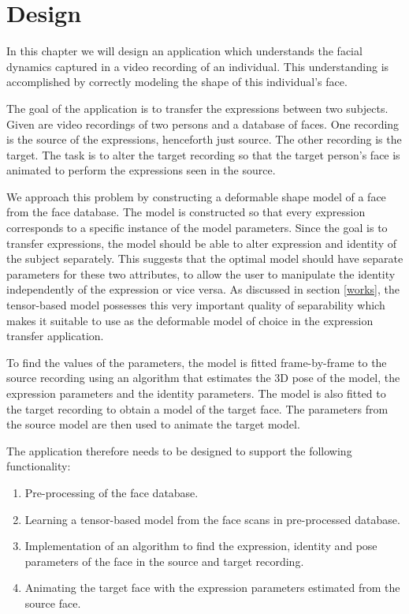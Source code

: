 \documentclass[11pt,a4paper]{report}
\begin{document}
\chapter{Design}\label{design}
In this chapter we will design an application which understands the facial
dynamics captured in a video recording of an individual. This understanding is
accomplished by correctly modeling the shape of this individual's face.

The goal of the application is to transfer the expressions between two
subjects. Given are video recordings of two persons and a database of
faces. One recording is the source of the expressions, henceforth just source. The
other recording is the target. The task is to alter the target recording so that
the target person's face is animated to perform the expressions seen in the
source.

We approach this problem by constructing a deformable shape model of a face from the
face database. The model is constructed so that every expression corresponds to a specific instance of the model
parameters. Since the goal is to transfer expressions, the model should be able
to alter expression and identity of the subject separately. This suggests that the optimal model should have
separate parameters for these two attributes, to allow the user to manipulate
the identity independently of the expression or vice versa.
As discussed in
section \ref{works}, the tensor-based model possesses this very
important quality of separability which makes it suitable to use as the
deformable model of choice in the expression transfer application.

To find the values of the parameters, the model is fitted frame-by-frame to the source recording using an
algorithm that estimates the 3D pose of the model, the expression parameters and
the identity parameters. The model is also fitted to the target recording to obtain a model of the target face. The
parameters from the source model are then used to animate the target model.

The application therefore needs to be designed to support the following functionality:

\begin{enumerate}
\item Pre-processing of the face database.
\item Learning a tensor-based model from the face scans in pre-processed database.
\item Implementation of an algorithm to find the expression, identity and pose
  parameters of the face in the source and target recording.
\item Animating the target face with the expression parameters estimated from
  the source face.
\end{enumerate}
\end{document}

